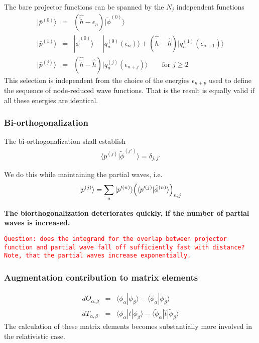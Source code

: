 \documentclass[11pt,a4paper]{report}
\newcommand{\petertt}[1]{\textcolor{red}{\texttt{#1}}}
\begin{document}
The bare projector functions can be spanned by the $N_j$ independent functions
\begin{eqnarray}
|\bar{p}^{(0)}\rangle&=&(\hat{\tilde{h}}-\epsilon_{n})|\tilde{\phi}^{(0)}\rangle
\nonumber\\
|\bar{p}^{(1)}\rangle&=&|\tilde{\phi}^{(0)}\rangle-|q_n^{(0)}(\epsilon_n)\rangle
+(\hat{\tilde{h}}-\hat{h})
|q_n^{(1)}(\epsilon_{n+1})\rangle
\nonumber\\
|\bar{p}^{(j)}\rangle&=&(\hat{\tilde{h}}-\hat{h})|q_n^{(j)}(\epsilon_{n+j})\rangle
\qquad\text{for $j\ge2$}
\end{eqnarray}
This selection is independent from the choice of the energies
$\epsilon_{n+p}$ used to define the sequence of node-reduced wave
functions. That is the result is equally valid if all these energies
are identical.


\subsubsection{Bi-orthogonalization}
The bi-orthogonalization shall establish 
\begin{eqnarray}
\langle p^{(j)}|\tilde{\phi}^{(j')}\rangle=\delta_{j,j'}
\end{eqnarray}

We do this while maintaining the partial waves, i.e.
\begin{eqnarray}
|p^{(j)}\rangle=\sum_{n}|p'^{(n)}\rangle
\Bigl(\langle p'^{(j)}|\tilde{\phi}^{(n)}\rangle\Bigr)_{n,j}
\end{eqnarray}

\textbf{The biorthogonalization deteriorates quickly, if the number of
  partial waves is increased.}


\petertt{Question: does the integrand for the overlap between
  projector function and partial wave fall off sufficiently fast with
  distance? Note, that the partial waves increase exponentially.}


\subsubsection{Augmentation contribution to matrix elements}
\begin{eqnarray}
dO_{\alpha,\beta}&=&\langle\phi_\alpha|\phi_\beta\rangle-
\langle\tilde{\phi}_\alpha|\tilde{\phi}_\beta\rangle
\nonumber\\
dT_{\alpha,\beta}&=&\langle\phi_\alpha|\hat{t}|\phi_\beta\rangle-
\langle\tilde{\phi}_\alpha|\hat{t}|\tilde{\phi}_\beta\rangle
\end{eqnarray}
The calculation of these matrix elements becomes substantially more
involved in the relativistic case.
\end{document}
